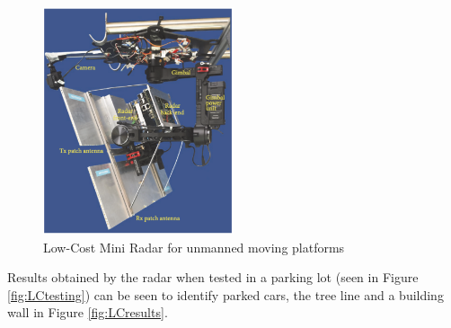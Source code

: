 \begin{figure}[h!]
    \centering
    \includegraphics[width = 0.5\textwidth]{images/lowcostminiradar.pdf}
    \caption{Low-Cost Mini Radar for unmanned moving platforms \cite{tarchi_low-cost_2017}}\label{fig:LowcostminiRadar}
\end{figure}
Results obtained by the radar when tested in a parking lot (seen in Figure \ref{fig:LCtesting}) can be seen to identify parked cars, the tree line and a building wall in Figure \ref{fig:LCresults}.

